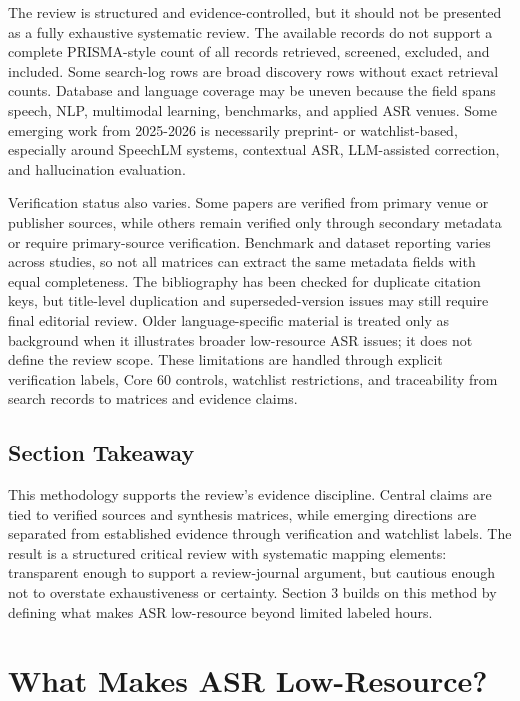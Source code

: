 \documentclass[pdflatex,sn-basic]{sn-jnl}
\theoremstyle{thmstyleone}
\theoremstyle{thmstyletwo}
\theoremstyle{thmstylethree}
\begin{document}
The review is structured and evidence-controlled, but it should not be presented as a fully exhaustive systematic review. The available records do not support a complete PRISMA-style count of all records retrieved, screened, excluded, and included. Some search-log rows are broad discovery rows without exact retrieval counts. Database and language coverage may be uneven because the field spans speech, NLP, multimodal learning, benchmarks, and applied ASR venues. Some emerging work from 2025-2026 is necessarily preprint- or watchlist-based, especially around SpeechLM systems, contextual ASR, LLM-assisted correction, and hallucination evaluation.

Verification status also varies. Some papers are verified from primary venue or publisher sources, while others remain verified only through secondary metadata or require primary-source verification. Benchmark and dataset reporting varies across studies, so not all matrices can extract the same metadata fields with equal completeness. The bibliography has been checked for duplicate citation keys, but title-level duplication and superseded-version issues may still require final editorial review. Older language-specific material is treated only as background when it illustrates broader low-resource ASR issues; it does not define the review scope. These limitations are handled through explicit verification labels, Core 60 controls, watchlist restrictions, and traceability from search records to matrices and evidence claims.

\subsection{Section Takeaway}

This methodology supports the review's evidence discipline. Central claims are tied to verified sources and synthesis matrices, while emerging directions are separated from established evidence through verification and watchlist labels. The result is a structured critical review with systematic mapping elements: transparent enough to support a review-journal argument, but cautious enough not to overstate exhaustiveness or certainty. Section 3 builds on this method by defining what makes ASR low-resource beyond limited labeled hours.

\section{What Makes ASR Low-Resource?}
\end{document}

